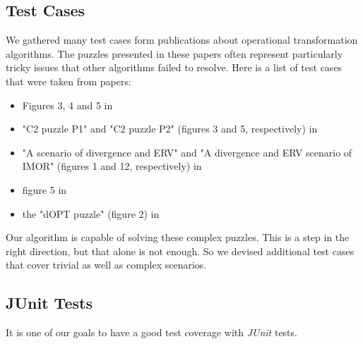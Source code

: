 \subsection{Test Cases}
We gathered many test cases form publications about operational transformation algorithms. The puzzles presented in these papers often represent particularly tricky issues that other algorithms failed to resolve. Here is a list of test cases that were taken from papers:

\begin{itemize}
 \item Figures 3, 4 and 5 in \cite{imine03b}
 \item "C2 puzzle P1" and "C2 puzzle P2" (figures 3 and 5, respectively) in \cite{imine04}
 \item "A scenario of divergence and ERV" and  "A divergence and ERV scenario of IMOR" (figures 1 and 12, respectively) in \cite{li04}
 \item figure 5 in \cite{suleiman98}
 \item the "dOPT puzzle" (figure 2) in \cite{sun98b} 
\end{itemize}

Our algorithm is capable of solving these complex puzzles. This is a step in the right direction, but that alone is not enough. So we devised additional test cases that cover trivial as well as complex scenarios.

\subsection{JUnit Tests}
It is one of our goals to have a good test coverage with \emph{JUnit} tests.
